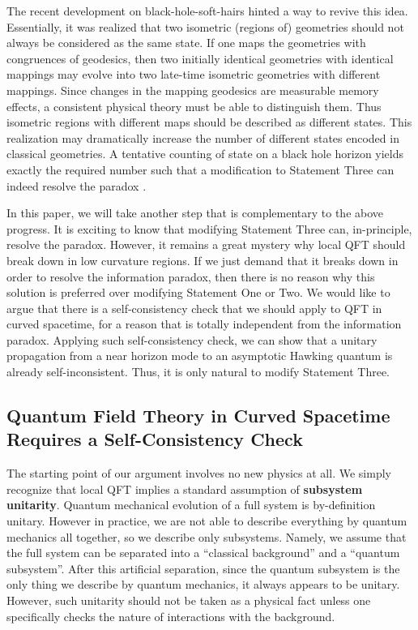 \documentclass[aps,showpacs,onecolumn,floats,prd,superscriptaddress,nofootinbib]{revtex4-1}
\begin{document}
The recent development on black-hole-soft-hairs \cite{HawPer16} hinted a way to revive this idea.
Essentially, it was realized that two isometric (regions of) geometries should not always be considered as the same state.
If one maps the geometries with congruences of geodesics, then two initially identical geometries with identical mappings may evolve into two late-time isometric geometries with different mappings. 
Since changes in the mapping geodesics are measurable memory effects, a consistent physical theory must be able to distinguish them.
Thus isometric regions with different maps should be described as different states.
This realization may dramatically increase the number of different states encoded in classical geometries.
A tentative counting of state on a black hole horizon yields exactly the required number such that a modification to Statement Three can indeed resolve the paradox \cite{HawPer16}.

In this paper, we will take another step that is complementary to the above progress. It is exciting to know that modifying Statement Three can, in-principle, resolve the paradox.
However, it remains a great mystery why local QFT should break down in low curvature regions. 
If we just demand that it breaks down in order to resolve the information paradox, then there is no reason why this solution is preferred over modifying Statement One or Two. 
We would like to argue that there is a self-consistency check that we should apply to QFT in curved spacetime, for a reason that is totally independent from the information paradox.
Applying such self-consistency check, we can show that a unitary propagation from a near horizon mode to an asymptotic Hawking quantum is already self-inconsistent. 
Thus, it is only natural to modify Statement Three.

\subsection{Quantum Field Theory in Curved Spacetime Requires a Self-Consistency Check}

The starting point of our argument involves no new physics at all.
We simply recognize that local QFT implies a standard assumption of {\bf subsystem unitarity}.
Quantum mechanical evolution of a full system is by-definition unitary. 
However in practice, we are not able to describe everything by quantum mechanics all together, so we describe only subsystems. 
Namely, we assume that the full system can be separated into a ``classical background'' and a ``quantum subsystem''. 
After this artificial separation, since the quantum subsystem is the only thing we describe by quantum mechanics, it always appears to be unitary.
However, such unitarity should not be taken as a physical fact unless one specifically checks the nature of interactions with the background.
\end{document}
